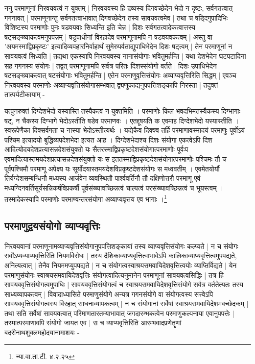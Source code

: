  ननु परमाणूनां निरवयवत्वं न युक्तम् | निरवयवस्य हि द्रव्यस्य दिगवच्छेदेन भेदो न दृष्टः, सर्वगतत्वात् गगनावत् | परमाणूनान्तु सर्वगतत्वाभावात् दिगवच्छेदेन तस्य सावयवत्वमेव | तथा च षड्दिगुपादिभिः विशिष्टस्य परमाणोः पुनः षडवयवाः सिध्यन्ति इति चेन्न | दिशः सर्वगतत्वादेकत्वात्तस्य षट्सङ्ख्याकत्वमनुपपन्नम् | षडुपाधीनां विरहादेव परमाणूनामपि न षडवयवकत्वम् | अस्तु वा 'अयमस्माद्विप्रकृष्टः' इत्यादिव्यवहारनिर्वाहार्थं सुमेरुपर्वताद्युपाधिभेदेन दिशः षट्त्वम् | तेन परमाणूनां न सावयवत्वं सिध्यति | तद्यथा एकस्यापि निरवयवस्य नानासंयोगाः भवितुमर्हन्ति | यथा देशभेदेन घटपटादिना सह गगनस्य संयोगः | तद्वत् परमाणूनामपि सर्वत्र परितः दिशस्संयोगो वर्तते | दिशः उपाधिभेदेन षटसङ्ख्याकत्वात् षटसंयोगाः भवितुमर्हन्ति | एतेन परमाणुवृत्तिसंयोगः अव्याप्यवृत्तिरिति सिद्धम् | एवञ्च निरवयवस्य परमाणोः अव्याप्यवृत्तिसंयोगासम्भवात् द्व्यणुकाद्यनुपपत्तिशङ्कापि निरस्ता | तदुक्तं तात्पर्यटीकायाम् -

{\fontsize{11.7}{0}\selectfont\s यत्पुनरुक्तं दिग्देशभेदो यस्यास्ति तस्यैकत्वं न युक्तमिति । परमाणोः किल भवदभिमतस्यैकस्य दिग्भागाः षट्, न चैकस्य दिग्भागे भेदोऽस्तीति षडेव परमाणवः । एतद्दूषयति क एवमाह दिग्देशभेदो यस्यास्तीति । स्वरूपेणैका दिक्सर्वगता च नास्या भेदोऽस्तीत्यर्थः । यद्येकैव दिक्क्व तर्हि परमाणावस्मादयं परमाणुः पूर्वोऽयं पश्चिम इत्यादयो बुद्धिव्यपदेशभेदा इत्यत आह । दिग्देशभेदाश्च दिशः संयोगा एकत्वेऽपि दिश आदित्योदयदेशप्रत्यासन्नदेशसंयुक्तो यः सैतरस्माद्विप्रकृष्टदेशसंयोगात्परमाणोः पूर्वःप एवमादित्यास्तमयदेशप्रत्यासन्नदेशसंयुक्तो यः स इततस्माद्विप्रकृष्टदेशसंयोगात्परमाणोः पश्चिमः तौ च पूर्वपश्चिमौ परमाणू अपेक्ष्य यः सूर्योदयास्तमयदेशविप्रकृष्टदेशसंयोगः स मध्ववतीम् । एवमेतयोर्यौ तिर्यग्देशसम्बन्धिनौ मध्यस्य आर्जवेन व्यवस्थितौ पार्श्ववर्तिनौ तौ दक्षिणोत्तरौ परमाणू एवं मध्यन्दिनवर्तिसूर्यसन्निकर्षविप्रकर्षौ पूर्वसंख्यावच्छिन्नत्वं चाल्पत्वं परसंख्यावच्छिन्नत्वं च भूयस्त्वम् । तस्मादेकस्यापि परमाणोः परमाण्वन्तरसंयोगा अव्याप्यवृत्तय एव भागाः ।\footnote{न्या.वा.ता.टी. ४.२.२५}}

\subsection{परमाणुद्वयसंयोगो व्याप्यवृत्तिः}

निरवयवानां परमाणूनामव्याप्यवृत्तिसंयोगानुपपत्तिशङ्कायां तस्य व्याप्यवृत्तिसंयोगः कल्प्यते | न च संयोगः सर्वोऽप्यव्याप्यवृत्तिरिति नियमविरोधः | तस्य दैशिकाव्याप्यवृत्तित्वाभावेऽपि कालिकाव्याप्यवृत्तित्वमुपपद्यते, अनित्यत्वात् | तेनैव नियममप्युपपद्यते | न च संयोगत्वस्वाश्रयसमवायिदेशवृत्तित्वयोः व्याप्तिर्विद्यते | येन परमाणुसंयोगः स्वाश्रयसमवायिदेशवृत्तिः संयोगत्वादित्यनुमानेन परमाणूनां सावयवत्वसिद्धिः | तत्र हि सावयववृत्तिसंयोगत्वमुपाधिः | सावयववृत्तिसंयोगत्वं च स्वाश्रयसमवायिदेशवृत्तिसंयोगे सर्वत्र वर्ततेत्यतः तस्य साध्यव्यापकत्वम् | विवादाध्यासिते परमाणुसंयोगे अन्यत्र गगनसंयोगे वा संयोगत्वस्य सत्त्वेऽपि सावयववृत्तिसंयोगत्वस्य विरहात् साधनाव्यापकत्वम् | न च संयोगानां सर्वेषां स्वाश्रयसमवायिदेशमवच्छेदकम् | तथा सति सर्वेषां सावयवत्वात् परिमाणतारतम्याभावात् जगदारम्भकत्वेन परमाणुकल्पनाया एवानुपपत्तेः | तस्मात्परमाणावपि संयोगो जायत एव | स च व्याप्यवृत्तिरिति आरम्भवादप्रणेतॄणां बदरीनाथशुक्लमहोदयानामाशयः - 

